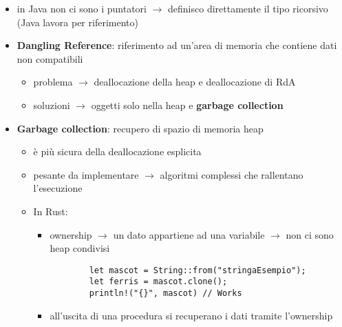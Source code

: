 \documentclass{article}
\begin{document}
\begin{flushleft}
\begin{itemize}
  \item in Java non ci sono i puntatori $\rightarrow$ definisco direttamente il tipo ricorsivo (Java lavora per riferimento)
  \item \textbf{Dangling Reference}: riferimento ad un'area di memoria che contiene dati non compatibili
  \begin{itemize}
    \item problema $\rightarrow$ deallocazione della heap e deallocazione di RdA
    \item soluzioni $\rightarrow$ oggetti solo nella heap e \textbf{garbage collection}
  \end{itemize}
  \item \textbf{Garbage collection}: recupero di spazio di memoria heap 
  \begin{itemize}
    \item è più sicura della deallocazione esplicita
    \item pesante da implementare $\rightarrow$ algoritmi complessi che rallentano l'esecuzione
    \item In Rust:
    \begin{itemize}
      \item ownership $\rightarrow$ un dato appartiene ad una variabile $\rightarrow$ non ci sono heap condivisi
      \begin{lstlisting}
        let mascot = String::from("stringaEsempio");
        let ferris = mascot.clone();
        println!("{}", mascot) // Works
      \end{lstlisting}
      \item all'uscita di una procedura si recuperano i dati tramite l'ownership
    \end{itemize}
  \end{itemize}
\end{itemize}

\end{flushleft}
\end{document}
